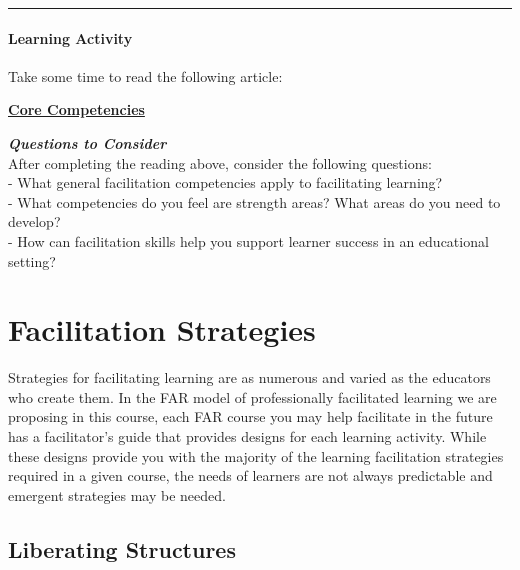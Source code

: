 \documentclass[
]{book}
\begin{document}
\begin{center}\rule{0.5\linewidth}{0.5pt}\end{center}

\begin{reflect}
\hypertarget{learning-activity}{%
\paragraph{Learning Activity}\label{learning-activity}}

Take some time to read the following article:

\href{https://www.iaf-world.org/site/professional/core-competencies}{\textbf{Core
Competencies}}

\textbf{\emph{Questions to Consider}}\\
After completing the reading above, consider the following questions:\\
- What general facilitation competencies apply to facilitating
learning?\\
- What competencies do you feel are strength areas? What areas do you
need to develop?\\
- How can facilitation skills help you support learner success in an
educational setting?
\end{reflect}

\hypertarget{facilitation-strategies}{%
\section{Facilitation Strategies}\label{facilitation-strategies}}

Strategies for facilitating learning are as numerous and varied as the educators who create them. In the FAR model of professionally facilitated learning we are proposing in this course, each FAR course you may help facilitate in the future has a facilitator's guide that provides designs for each learning activity. While these designs provide you with the majority of the learning facilitation strategies required in a given course, the needs of learners are not always predictable and emergent strategies may be needed.

\hypertarget{liberating-structures}{%
\subsection*{Liberating Structures}\label{liberating-structures}}
\end{document}
